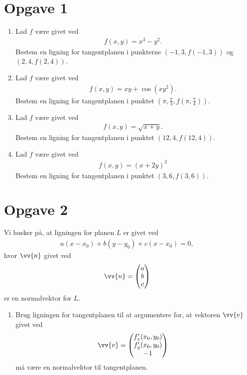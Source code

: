 \section*{Opgave 1}
\begin{enumerate}[label=\roman*)]
	\item Lad $f$ være givet ved
	\begin{align*}
		f(x,y) = x^3-y^2.
	\end{align*}
	Bestem en ligning for tangentplanen i punkterne $(-1,3,f(-1,3))$ og $(2,4,f(2,4))$.
	\item Lad $f$ være givet ved
	\begin{align*}
		f(x,y) = xy+\cos(xy^2).
	\end{align*}
	Bestem en ligning for tangentplanen i punktet $(\pi,\frac{\pi}{4},f(\pi,\frac{\pi}{4}))$.
	\item Lad $f$ være givet ved
	\begin{align*}
		f(x,y) = \sqrt{x+y}.
	\end{align*}
	Bestem en ligning for tangentplanen i punktet $(12,4,f(12,4))$. 
	\item Lad $f$ være givet ved 
	\begin{align*}
		f(x,y) = (x+2y)^3
	\end{align*}
	Bestem en ligning for tangentplanen i punktet $(3,6,f(3,6))$.
\end{enumerate}

\section*{Opgave 2}
Vi husker på, at ligningen for planen $L$ er givet ved
\begin{align*}
	a(x-x_0)+b(y-y_0)+c(x-x_0)=0,
\end{align*}
hvor $\vv{n}$ givet ved
\begin{align*}
	\vv{n} = 
	\begin{pmatrix}
		a \\ b \\ c
	\end{pmatrix}
\end{align*}
er en normalvektor for $L$. 
\begin{enumerate}[label=\roman*)]
	\item Brug ligningen for tangentplanen til at argumentere for, at vektoren $\vv{v}$ givet 
	ved
	\begin{align*}
		\vv{v} = 
		\begin{pmatrix}
			f_x'(x_0,y_0) \\
			f_y'(x_0,y_0) \\
			-1
		\end{pmatrix}
	\end{align*}
	må være en normalvektor til tangentplanen. 
\end{enumerate}
